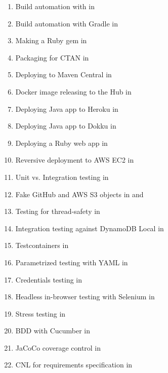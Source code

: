 \documentclass[nobrand,anonymous,nodate,nosecurity]{huawei}
\begin{document}
{\begin{enumerate}
	\item Build automation with  in 
	\item Build automation with Gradle in 
  \vspace{3pt}

	\item Making a Ruby gem in 
	\item Packaging for CTAN in 
	\item Deploying to Maven Central in 
  \item Docker image releasing to the Hub in 
  \vspace{3pt}

	\item Deploying Java app to Heroku in 
	\item Deploying Java app to Dokku in 
	\item Deploying a Ruby web app in 
  \item Reversive deployment to AWS EC2 in 
  \vspace{3pt}

  \item Unit vs. Integration testing in 
	\item Fake GitHub and AWS S3 objects in  and 
  \item Testing for thread-safety in 
	\item Integration testing against DynamoDB Local in 
  \item Testcontainers in 
  \item Parametrized testing with YAML in 
  \vspace{3pt}

  \item Credentials testing in 
  \item Headless in-browser testing with Selenium in 
  \item Stress testing in 
  \item BDD with Cucumber in 
	\item JaCoCo coverage control in 
  \item CNL for requirements specification in 
  \vspace{3pt}


\end{enumerate}}
\end{document}
